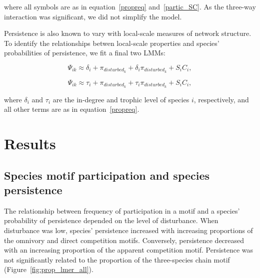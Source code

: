 \documentclass[12pt]{article}
\begin{document}
\begin{spacing}{2.0}
        where all symbols are as in equation~\ref{propreq} and~\ref{partic_SC}.
        As the three-way interaction was significant, we did not simplify the model. 


        Persistence is also known to vary with local-scale measures of network structure. 
        To identify the relationships betwen local-scale properties and species' probabilities of persistence, we fit a final two LMMs:
        
        \begin{equation}
                \Psi_{ik} \approx \delta_{i} + \pi_{disturbed_k} + \delta_{i}\pi_{disturbed_k} +
                S_{i}C_{i} ,
                \label{degeq}
            \end{equation}
    
        \begin{equation}
                \Psi_{ik} \approx \tau_{i} + \pi_{disturbed_k} + \tau_{i}\pi_{disturbed_k} +
                S_{i}C_{i} ,
                \label{TLeq}
            \end{equation}
    
        where $\delta_{i}$ and $\tau_i$ are the in-degree and trophic level of species $i$, respectively, and all other terms are as in equation~\ref{propreq}. 


\section*{Results}


    \subsection*{Species motif participation and species persistence} 
    
       The relationship between frequency of participation in a motif and a species' probability of persistence depended on the level of disturbance. 
       When disturbance was low, species' persistence increased with increasing proportions of the omnivory and direct competition motifs. 
       Conversely, persistence decreased with an increasing proportion of the apparent competition motif. 
       Persistence was not significantly related to the proportion of the three-species chain motif (Figure~\ref{fig:prop_lmer_all}).
            

\end{spacing}
\end{document}
